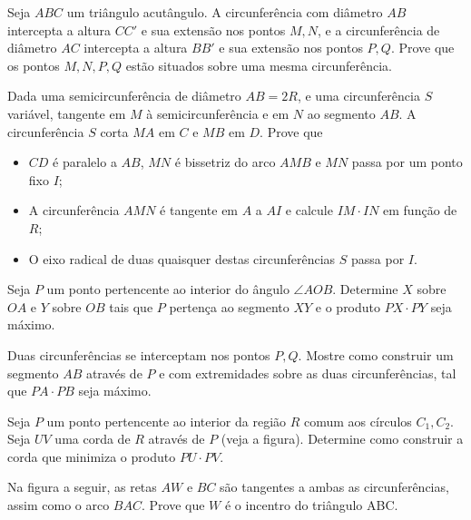 \begin{questao}
  Seja $ABC$ um triângulo acutângulo. A circunferência com
  diâmetro $AB$ intercepta a altura $CC'$ e sua extensão nos
  pontos $M,N$, e a circunferência de diâmetro $AC$ intercepta a
  altura $BB'$ e sua extensão nos pontos $P,Q$. Prove que os
  pontos $M,N,P,Q$ estão situados sobre uma mesma circunferência.
\end{questao}

\begin{questao}
  Dada uma semicircunferência de diâmetro $AB=2R$, e uma
  circunferência $S$ variável, tangente em $M$ à
  semicircunferência e em $N$ ao segmento $AB$. A circunferência
  $S$ corta $MA$ em $C$ e $MB$ em $D$. Prove que

  \begin{itemize}    
    \item $CD$ é paralelo a $AB$, $MN$ é bissetriz do arco
    $AMB$ e $MN$ passa por um ponto fixo $I$;
    \item A circunferência $AMN$ é tangente em $A$ a $AI$ e
    calcule $IM \cdot IN$ em função de $R$;

    \item O eixo radical de duas quaisquer destas circunferências
    $S$ passa por $I$.
  \end{itemize}
\end{questao}

\begin{questao}
  Seja $P$ um ponto pertencente ao interior do ângulo
  $\angle AOB$. Determine $X$ sobre $OA$ e  $Y$ sobre $OB$
  tais que $P$ pertença ao segmento $XY$ e o produto $PX \cdot
  PY$ seja máximo.
\end{questao}

\begin{questao}
  Duas circunferências se interceptam nos pontos
  $P,Q$. Mostre como construir um segmento $AB$ através de $P$ e
  com extremidades sobre as duas circunferências, tal que $PA \cdot
  PB$ seja máximo.
\end{questao}

\begin{questao}
  Seja $P$ um ponto pertencente ao interior da região
  $R$ comum aos círculos $C_1,C_2$. Seja $UV$ uma corda de $R$
  através de $P$ (veja a figura). Determine como construir a corda
  que minimiza o produto $PU \cdot PV$.
\end{questao}

\begin{questao}
  Na figura a seguir, as retas $AW$ e $BC$ são tangentes
  a ambas as circunferências, assim como o arco $BAC$. Prove que
  $W$ é o incentro do triângulo ABC.
\end{questao}

